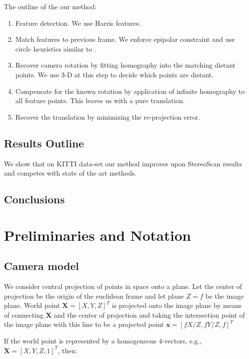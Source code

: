 \documentclass[runningheads]{llncs}
\begin{document}
The outline of the our method:
\begin{enumerate}
\item Feature detection.  We use Harris \cite{Harris1987} features.
\item Match features to previous frame. We enforce epipolar constraint
  and use circle heuristics similar to \cite{Geiger2011}.
\item Recover camera rotation by fitting homography into the matching
  distant points.  We use 3-D at this step to decide which points are
  distant.
\item Compensate for the known rotation by application of infinite
  homography to all feature points.  This leaves us with a pure
  translation.
\item Recover the translation by minimizing the re-projection error.
\end{enumerate}

\subsection{Results Outline}

We show that on KITTI data-set our method improves upon StereoScan
results and competes with state of the art methods.

\subsection{Conclusions}

\section{Preliminaries and Notation}

\subsection{Camera model}

We consider central projection of points in space onto a plane. Let
the center of projection be the origin of the euclidean frame and let
plane $Z=f$ be the image plane. World point $\mathbf{X}=[X,Y,Z]^T$ is
projected onto the image plane by means of connecting $\mathbf{X}$ and
the center of projection and taking the intersection point of the
image plane with this line to be a projected point
$\mathbf{x}=[fX/Z,fY/Z,f]^T$


If the world point is represented by a homogeneous 4-vectors, e.g.,
$\mathbf{X} = [X,Y,Z,1]^T$, then:
\end{document}
